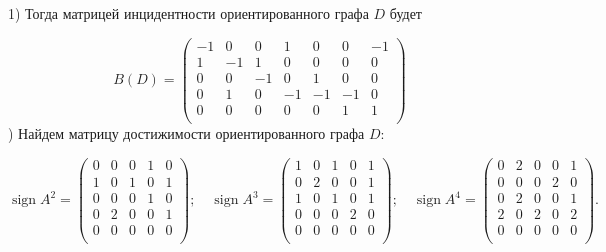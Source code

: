 \documentclass[fleqn]{article}
\DeclareMathOperator{\sign}{sign}
\begin{document}
1) Тогда матрицей инцидентности ориентированного графа $D$ будет

$$B(D)=
\begin{pmatrix}
-1 & 0 & 0 & 1 & 0 & 0 & -1 \\
1 & -1 & 1 & 0 & 0 & 0 & 0 \\
0 & 0 & -1 & 0 & 1 & 0 & 0 \\
0 & 1 & 0 & -1 & -1 & -1 & 0 \\
0 & 0 & 0 & 0 & 0 & 1 & 1 \\
\end{pmatrix}
$$
) Найдем матрицу достижимости ориентированного графа $D$:

$$
\sign{A^2} = \begin{pmatrix}
0 & 0 & 0 & 1 & 0 \\
1 & 0 & 1 & 0 & 1 \\
0 & 0 & 0 & 1 & 0 \\
0 & 2 & 0 & 0 & 1 \\
0 & 0 & 0 & 0 & 0 \\
\end{pmatrix}
;\quad
\sign{A^3} = \begin{pmatrix}
1 & 0 & 1 & 0 & 1 \\
0 & 2 & 0 & 0 & 1 \\
1 & 0 & 1 & 0 & 1 \\
0 & 0 & 0 & 2 & 0 \\
0 & 0 & 0 & 0 & 0 \\
\end{pmatrix}
;\quad
\sign{A^4} = \begin{pmatrix}
0 & 2 & 0 & 0 & 1 \\
0 & 0 & 0 & 2 & 0 \\
0 & 2 & 0 & 0 & 1 \\
2 & 0 & 2 & 0 & 2 \\
0 & 0 & 0 & 0 & 0 \\
\end{pmatrix}.
$$
\end{document}
